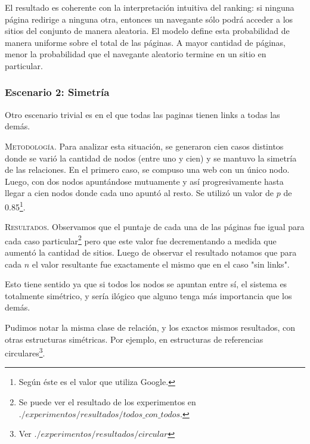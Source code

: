 \vspace{1em}
El resultado es coherente con la interpretación intuitiva del ranking: si ninguna página redirige a ninguna otra, entonces un navegante sólo podrá acceder a los sitios del conjunto de manera aleatoria. El modelo define esta probabilidad de manera uniforme sobre el total de las páginas. A mayor cantidad de páginas, menor la probabilidad que el navegante aleatorio termine en un sitio en particular.









\vspace{2em}
\subsubsection{Escenario 2: Simetría} Otro escenario trivial es en el que todas las paginas tienen links a todas las demás. 

\vspace{2em}

\vspace{1em}
\noindent \textsc{Metodología}. Para analizar esta situación, se generaron cien casos distintos donde se varió la cantidad de nodos (entre uno y cien) y se mantuvo la simetría de las relaciones. En el primero caso, se compuso una web con un único nodo. Luego, con dos nodos apuntándose mutuamente y así progresivamente hasta llegar a cien nodos donde cada uno apuntó al resto. Se utilizó un valor de $p$ de 0.85\footnote{Según \cite{Langville04} éste es el valor que utiliza Google.}.

\vspace{1em}
\noindent \textsc{Resultados}. Observamos que el puntaje de cada una de las páginas fue igual para cada caso particular\footnote{Se puede ver el resultado de los experimentos en $./experimentos/resultados/todos\_con\_todos$.} pero que este valor fue decrementando a medida que aumentó la cantidad de sitios. Luego de observar el resultado notamos que para cada $n$ el valor resultante fue exactamente el mismo que en el caso "sin links".

Esto tiene sentido ya que si todos los nodos se apuntan entre sí, el sistema es totalmente simétrico, y sería ilógico que alguno tenga más importancia que los demás. 

\vspace{1em}
\noindent Pudimos notar la misma clase de relación, y los exactos mismos resultados, con otras estructuras simétricas. Por ejemplo, en estructuras de referencias circulares\footnote{Ver $./experimentos/resultados/circular$}.


